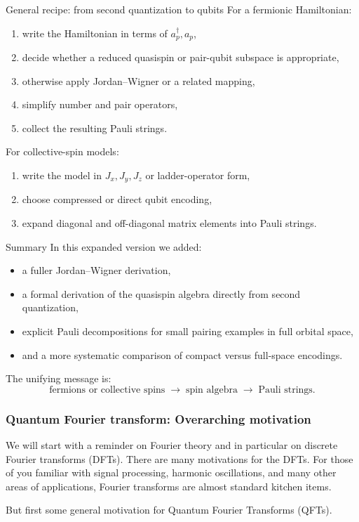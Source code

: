 \documentclass[aspectratio=169]{beamer}
\begin{document}
\begin{frame}{General recipe: from second quantization to qubits}
For a fermionic Hamiltonian:
\begin{enumerate}
\item write the Hamiltonian in terms of \(a_p^\dagger,a_p\),
\item decide whether a reduced quasispin or pair-qubit subspace is appropriate,
\item otherwise apply Jordan--Wigner or a related mapping,
\item simplify number and pair operators,
\item collect the resulting Pauli strings.
\end{enumerate}

For collective-spin models:
\begin{enumerate}
\item write the model in \(J_x,J_y,J_z\) or ladder-operator form,
\item choose compressed or direct qubit encoding,
\item expand diagonal and off-diagonal matrix elements into Pauli strings.
\end{enumerate}
\end{frame}

\begin{frame}{Summary}
In this expanded version we added:
\begin{itemize}
\item a fuller Jordan--Wigner derivation,
\item a formal derivation of the quasispin algebra directly from second quantization,
\item explicit Pauli decompositions for small pairing examples in full orbital space,
\item and a more systematic comparison of compact versus full-space encodings.
\end{itemize}

The unifying message is:
\[
\text{fermions or collective spins}
\;\longrightarrow\;
\text{spin algebra}
\;\longrightarrow\;
\text{Pauli strings}.
\]
\end{frame}

\begin{frame}
\frametitle{Quantum Fourier transform: Overarching motivation}

We will start with a reminder on Fourier theory and in particular on discrete Fourier transforms (DFTs).  There are many
motivations for the DFTs. For those of you familiar with signal
processing, harmonic oscillations, and many other areas of
applications, Fourier transforms are almost standard kitchen
items. 

But first some general motivation for Quantum Fourier Transforms (QFTs).
\end{frame}
\end{document}

